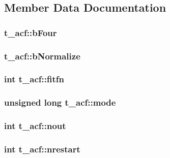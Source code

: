 \subsection{\-Member \-Data \-Documentation}
\hypertarget{structt__acf_a2a0eecf190d433079fb30e63928a303f}{
\subsubsection[{b\-Four}]{ {\bf t\-\_\-acf\-::b\-Four}}}\label{structt__acf_a2a0eecf190d433079fb30e63928a303f}
\hypertarget{structt__acf_ab1ed85cb36b2080780b02f65fe23fa43}{
\subsubsection[{b\-Normalize}]{ {\bf t\-\_\-acf\-::b\-Normalize}}}\label{structt__acf_ab1ed85cb36b2080780b02f65fe23fa43}
\hypertarget{structt__acf_a7da7fb08d99d1b90e3b5abaf0477d03d}{
\subsubsection[{fitfn}]{\setlength{\rightskip}{0pt plus 5cm}int {\bf t\-\_\-acf\-::fitfn}}}\label{structt__acf_a7da7fb08d99d1b90e3b5abaf0477d03d}
\hypertarget{structt__acf_a20b321cbf2033f4716be094de5ad6db1}{
\subsubsection[{mode}]{\setlength{\rightskip}{0pt plus 5cm}unsigned long {\bf t\-\_\-acf\-::mode}}}\label{structt__acf_a20b321cbf2033f4716be094de5ad6db1}
\hypertarget{structt__acf_aed99bd0c5456698897ea87a0a89fe8cf}{
\subsubsection[{nout}]{\setlength{\rightskip}{0pt plus 5cm}int {\bf t\-\_\-acf\-::nout}}}\label{structt__acf_aed99bd0c5456698897ea87a0a89fe8cf}
\hypertarget{structt__acf_a53fa8d88d63bd167fc42f84656ffdfcc}{
\subsubsection[{nrestart}]{\setlength{\rightskip}{0pt plus 5cm}int {\bf t\-\_\-acf\-::nrestart}}}\label{structt__acf_a53fa8d88d63bd167fc42f84656ffdfcc}
